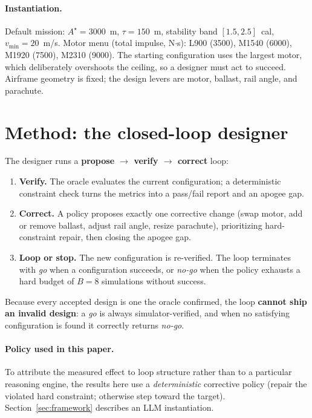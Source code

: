 \documentclass[11pt]{article}
\begin{document}
\paragraph{Instantiation.} Default mission: $A^\star = 3000$~m, $\tau = 150$~m,
stability band $[1.5, 2.5]$~cal, $v_{\min} = 20$~m/s. Motor menu (total impulse,
N$\cdot$s): L900 (3500), M1540 (6000), M1920 (7500), M2310 (9000). The starting
configuration uses the largest motor, which deliberately overshoots the ceiling,
so a designer must act to succeed. Airframe geometry is fixed; the design levers
are motor, ballast, rail angle, and parachute.

\section{Method: the closed-loop designer}

The designer runs a \textbf{propose $\rightarrow$ verify $\rightarrow$ correct}
loop:
\begin{enumerate}
  \item \textbf{Verify.} The oracle evaluates the current configuration; a
  deterministic constraint check turns the metrics into a pass/fail report and an
  apogee gap.
  \item \textbf{Correct.} A policy proposes exactly one corrective change (swap
  motor, add or remove ballast, adjust rail angle, resize parachute),
  prioritizing hard-constraint repair, then closing the apogee gap.
  \item \textbf{Loop or stop.} The new configuration is re-verified. The loop
  terminates with \emph{go} when a configuration succeeds, or \emph{no-go} when
  the policy exhausts a hard budget of $B = 8$ simulations without success.
\end{enumerate}

Because every accepted design is one the oracle confirmed, the loop
\textbf{cannot ship an invalid design}: a \emph{go} is always simulator-verified,
and when no satisfying configuration is found it correctly returns \emph{no-go}.

\paragraph{Policy used in this paper.} To attribute the measured effect to loop
structure rather than to a particular reasoning engine, the results here use a
\emph{deterministic} corrective policy (repair the violated hard constraint;
otherwise step toward the target). Section~\ref{sec:framework} describes an LLM
instantiation.
\end{document}
